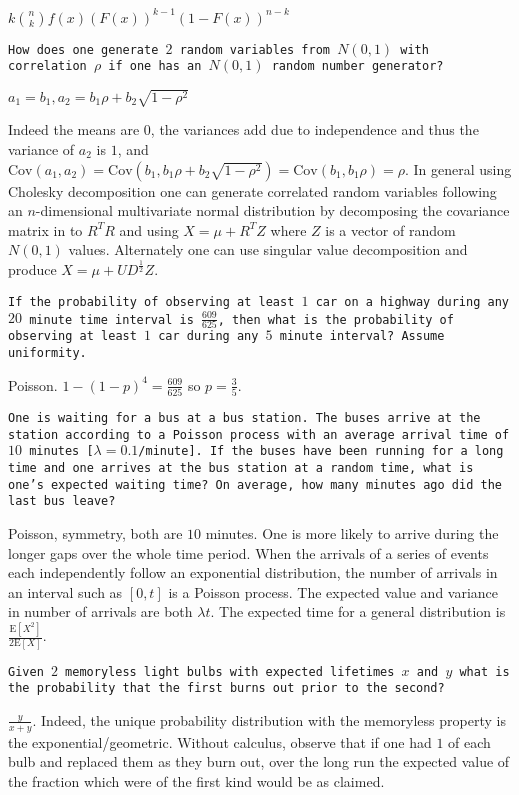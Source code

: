 $\boxed{k \binom{n}{k} f(x)(F(x))^{k-1}(1-F(x))^{n-k}}$

\texttt{How does one generate $2$ random variables from $N(0,1)$ with correlation $\rho$ if one has an $N(0,1)$ random number generator?}

$\boxed{a_1 = b_1, a_2 = b_1 \rho + b_2 \sqrt{1-\rho^2}}$

Indeed the means are $0$, the variances add due to independence and thus the variance of $a_2$ is $1$, and $\text{Cov}(a_1,a_2) = \text{Cov}(b_1,b_1 \rho + b_2 \sqrt{1-\rho^2}) = \text{Cov}(b_1,b_1 \rho) = \rho$. In general using Cholesky decomposition one can generate correlated random variables following an $n$-dimensional multivariate normal distribution by decomposing the covariance matrix in to $R^T R$ and using $X=\mu+R^T Z$ where $Z$ is a vector of random $N(0,1)$ values. Alternately one can use singular value decomposition and produce $X=\mu+UD^{\frac{1}{2}}Z$.

\texttt{If the probability of observing at least $1$ car on a highway during any $20$ minute time interval is $\frac{609}{625}$, then what is the probability of observing at least $1$ car during any $5$ minute interval? Assume uniformity.}

Poisson. $1-(1-p)^4 = \frac{609}{625}$ so $p = \boxed{\frac{3}{5}}$.

\texttt{One is waiting for a bus at a bus station. The buses arrive at the station according to a Poisson process with an average arrival time of $10$ minutes [$\lambda = 0.1$/minute]. If the buses have been running for a long time and one arrives at the bus station at a random time, what is one's expected waiting time? On average, how many minutes ago did the last bus leave?}

Poisson, symmetry, both are $\boxed{10}$ minutes. One is more likely to arrive during the longer gaps over the whole time period. When the arrivals of a series of events each independently follow an exponential distribution, the number of arrivals in an interval such as $[0,t]$ is a Poisson process. The expected value and variance in number of arrivals are both $\lambda t$. The expected time for a general distribution is $\boxed{\frac{\text{E}[X^2]}{2\text{E}[X]}}$.

\texttt{Given $2$ memoryless light bulbs with expected lifetimes $x$ and $y$ what is the probability that the first burns out prior to the second?}

$\boxed{\frac{y}{x+y}}$. Indeed, the unique probability distribution with the memoryless property is the exponential/geometric. Without calculus, observe that if one had $1$ of each bulb and replaced them as they burn out, over the long run the expected value of the fraction which were of the first kind would be as claimed.

